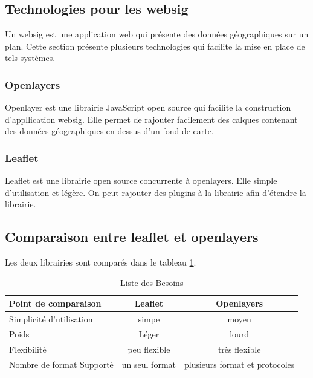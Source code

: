 \documentclass[
    iai, %
    il, %
]{heig-tb}
\begin{document}
\subsection{Technologies pour les \gls{websig}}
Un \gls{websig} est une application web qui présente des données géographiques sur un plan.
Cette section présente plusieurs technologies qui facilite la mise en place de tels systèmes.

\subsubsection{Openlayers}
Openlayer \cite{openlayers} est une librairie JavaScript open source qui facilite la construction d'appllication \gls{websig}.
Elle permet de rajouter facilement des calques contenant des données géographiques en dessus d'un fond de carte.

\subsubsection{Leaflet}

Leaflet \cite{leaflet} est une librairie open source concurrente à openlayers.
Elle simple d'utilisation et légère.
On peut rajouter des plugins à la librairie afin d'étendre la librairie.

\subsection{Comparaison entre leaflet et openlayers}

Les deux librairies sont comparés dans le tableau \ref{compare}.

\begin{table}[h]
    \begin{center}
        \caption{Liste des Besoins \label{compare}}
        \begin{tabular}{l|c|c}
            Point de comparaison      & Leaflet        & Openlayers                     \\ \hline
            Simplicité d'utilisation  & simpe          & moyen                          \\
            Poids                     & Léger          & lourd                          \\
            Flexibilité               & peu flexible   & très flexible                  \\
            Nombre de format Supporté & un seul format & plusieurs format et protocoles \\
        \end{tabular}
    \end{center}
\end{table}
\end{document}
